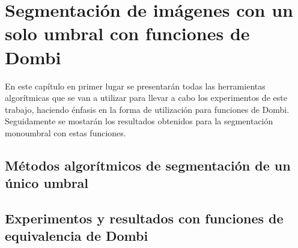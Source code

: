 \documentclass[main]{subfiles}
\begin{document}
\chapter{Segmentación de imágenes con un solo umbral con funciones de Dombi}\label{monoumbral}

En este capítulo en primer lugar se presentarán todas las herramientas algorítmicas que se van a utilizar para llevar a cabo los experimentos de este trabajo, haciendo énfasis en la forma de utilización para funciones de Dombi. Seguidamente se mostarán los resultados obtenidos para la segmentación monoumbral con estas funciones.


\section{Métodos algorítmicos de segmentación de un único umbral}\label{sec:algoritmosmono}



\section{Experimentos y resultados con funciones de equivalencia de Dombi}\label{sec:resultadosmono}

\end{document}
